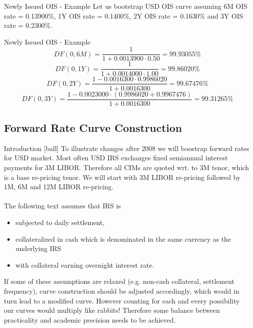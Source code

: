 \documentclass{beamer}
\begin{document}
\begin{frame}{Newly Issued OIS - Example}
Let us bootstrap USD OIS curve assuming 6M OIS rate = 0.13900\%, 1Y OIS rate = 0.1400\%, 2Y OIS rate = 0.1630\% and 3Y OIS rate = 0.2300\%.
\end{frame}

\begin{frame}{Newly Issued OIS - Example}
\begin{equation*}
DF(0, 6M) = \frac{1}{1 + 0.0013900 \cdot 0.50} = 99.93055\%
\end{equation*}
\begin{equation*}
DF(0, 1Y) = \frac{1}{1 + 0.0014000 \cdot 1.00} = 99.86020\%
\end{equation*}
\begin{equation*}
DF(0, 2Y) = \frac{1 - 0.0016300 \cdot 0.9986020}{1 + 0.0016300} = 99.67476\%
\end{equation*}
\begin{equation*}
DF(0, 3Y) = \frac{1 - 0.0023000 \cdot (0.9986020 + 0.9967476)}{1 + 0.0016300} = 99.31265\%
\end{equation*}
\end{frame}

\subsection{Forward Rate Curve Construction}

\begin{frame}{Introduction}
[ball]
To illustrate changes after 2008 we will boostrap forward rates for USD market. Most often USD IRS exchanges fixed semiannual interest payments for 3M LIBOR. Therefore all CIMs are quoted wrt. to 3M tenor, which is a base re-pricing tenor. We will start with 3M LIBOR re-pricing followed by 1M, 6M and 12M LIBOR re-pricing.
\\~\\
The following text assumes that IRS is
\begin{itemize}
\item subjected to daily settlement,
\item collateralized in cash which is denominated in the same currency as the underlying IRS
\item with collateral earning overnight interest rate.
\end{itemize}
If some of these assumptions are relaxed (e.g. non-cash collateral, settlement frequency), curve construction should be adjusted accordingly, which would in turn lead to a modified curve. However counting for each and every possibility our curves would multiply like rabbits! Therefore some balance between practicality and academic precision needs to be achieved.
\end{frame}
\end{document}
